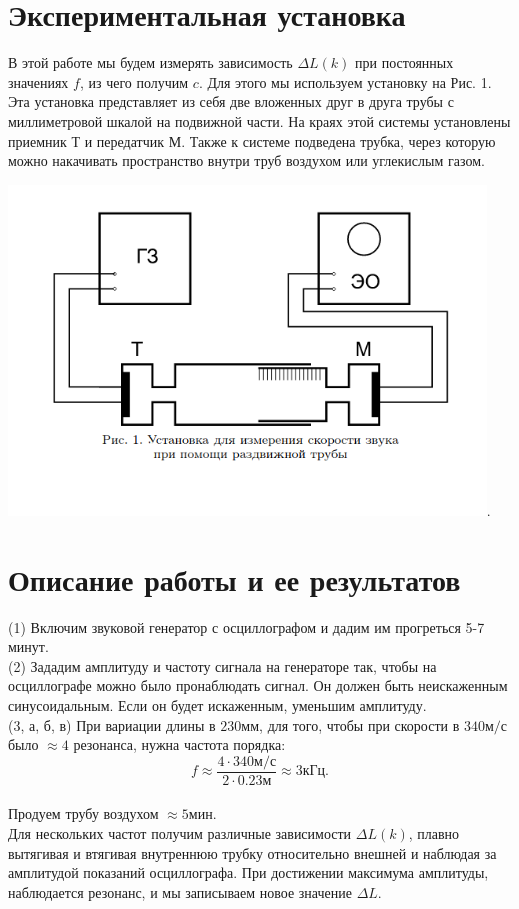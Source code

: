 \section*{Экспериментальная установка}
В этой работе мы будем измерять зависимость $\Delta L(k)$ при постоянных значениях $f$, из чего получим $c$. Для этого мы используем установку на Рис. 1. Эта установка представляет из себя две вложенных друг в друга трубы с миллиметровой шкалой на подвижной части. На краях этой системы установлены приемник Т и передатчик М. Также к системе подведена трубка, через которую можно накачивать пространство внутри труб воздухом или углекислым газом.
\begin{center}
\includegraphics[width=0.95\textwidth]{equip.png}.
\end{center}
\section*{Описание работы и ее результатов}
(1) Включим звуковой генератор с осциллографом и дадим им прогреться 5-7 минут.\\
(2) Зададим амплитуду и частоту сигнала на генераторе так, чтобы на осциллографе можно было пронаблюдать сигнал. Он должен быть неискаженным синусоидальным. Если он будет искаженным, уменьшим амплитуду.\\
(3, а, б, в) При вариации длины в $230 \text{мм}$, для того, чтобы при скорости в $340\text{м}/\text{с}$ было $\approx 4$ резонанса, нужна частота порядка:
$$f \approx \frac{4\cdot340\text{м}/\text{с}}{2 \cdot 0.23 \text{м}} \approx 3\text{кГц}.$$\\
Продуем трубу воздухом $\approx 5 \text{мин}$.\\
Для нескольких частот получим различные зависимости $\Delta L(k)$, плавно вытягивая и втягивая внутреннюю трубку относительно внешней и наблюдая за амплитудой показаний осциллографа. При достижении максимума амплитуды, наблюдается резонанс, и мы записываем новое значение $\Delta L$.

